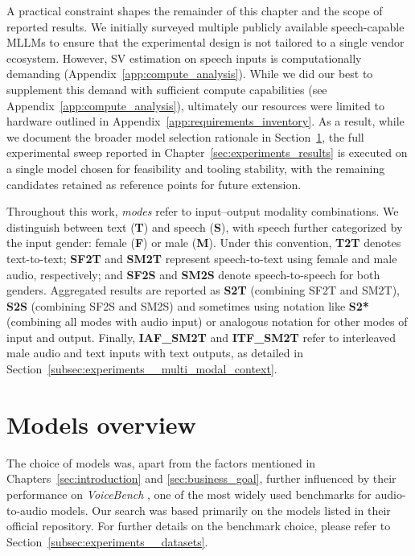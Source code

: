 A practical constraint shapes the remainder of this chapter and the scope of reported results.
We initially surveyed multiple publicly available speech-capable MLLMs to ensure that the experimental design is not tailored to a single vendor ecosystem.
However, SV estimation on speech inputs is computationally demanding (Appendix~\ref{app:compute_analysis}). While we did our best to supplement this demand with sufficient compute capabilities (see Appendix~\ref{app:compute_analysis}), ultimately our resources were limited to hardware outlined in Appendix~\ref{app:requirements_inventory}.
As a result, while we document the broader model selection rationale in Section~\ref{subsec:experiments__models}, the full experimental sweep reported in Chapter~\ref{sec:experiments_results} is executed on a single model chosen for feasibility and tooling stability, with the remaining candidates retained as reference points for future extension.

Throughout this work, \emph{modes} refer to input--output modality combinations. We distinguish between text (\textbf{T}) and speech (\textbf{S}), with speech further categorized by the input gender: female (\textbf{F}) or male (\textbf{M}). Under this convention, \textbf{T2T} denotes text-to-text; \textbf{SF2T} and \textbf{SM2T} represent speech-to-text using female and male audio, respectively; and \textbf{SF2S} and \textbf{SM2S} denote speech-to-speech for both genders. Aggregated results are reported as \textbf{S2T} (combining SF2T and SM2T), \textbf{S2S} (combining SF2S and SM2S) and sometimes using notation like \textbf{S2*} (combining all modes with audio input) or analogous notation for other modes of input and output. Finally, \textbf{IAF\_SM2T} and \textbf{ITF\_SM2T} refer to interleaved male audio and text inputs with text outputs, as detailed in Section~\ref{subsec:experiments__multi_modal_context}.

\section{Models overview}
\label{subsec:experiments__models}

The choice of models was, apart from the factors mentioned in Chapters~\ref{sec:introduction} and \ref{sec:business_goal}, further influenced by their performance on \textit{VoiceBench} \parencite{chen2024voicebench}, one of the most widely used benchmarks for audio-to-audio models. Our search was based primarily on the models listed in their official repository. For further details on the benchmark choice, please refer to Section~\ref{subsec:experiments__datasets}.


